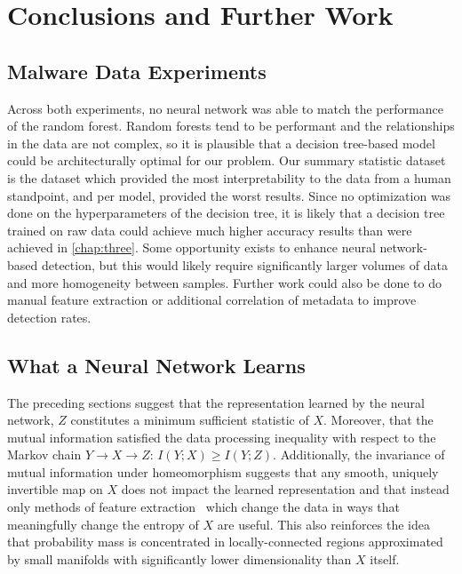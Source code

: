 \chapter{Conclusions and Further Work}
\label{chap:conclusion}

\section{Malware Data Experiments}
Across both experiments, no neural network was able to match the performance of the random forest.
Random forests tend to be performant and the relationships in the data are not complex, so it is plausible that a decision tree-based model could be architecturally optimal for our problem. 
Our summary statistic dataset is the dataset which provided the most interpretability to the data from a human standpoint, and per model, provided the worst results. 
Since no optimization was done on the hyperparameters of the decision tree, it is likely that a decision tree trained on raw data could achieve much higher accuracy results than were achieved in \ref{chap:three}. 
Some opportunity exists to enhance neural network-based detection, but this would likely require significantly larger volumes of data and more homogeneity between samples.
Further work could also be done to do manual feature extraction or additional correlation of metadata to improve detection rates.


\section{What a Neural Network Learns}
The preceding sections suggest that the representation learned by the neural network, $Z$ constitutes a minimum sufficient statistic of $X$. 
Moreover, that the mutual information satisfied the data processing inequality with respect to the Markov chain $Y \to X \to Z$: $I(Y; X) \geq I(Y; Z)$.
Additionally, the invariance of mutual information under homeomorphism suggests that any smooth, uniquely invertible map on $X$ does not impact the learned representation and that instead only methods of feature extraction~\cite{goodfellow2016deep} which change the data in ways that meaningfully change the entropy of $X$ are useful.
This also reinforces the idea~\cite{goodfellow2014explaining} that probability mass is concentrated in locally-connected regions approximated by small manifolds with significantly lower dimensionality than $X$ itself.


